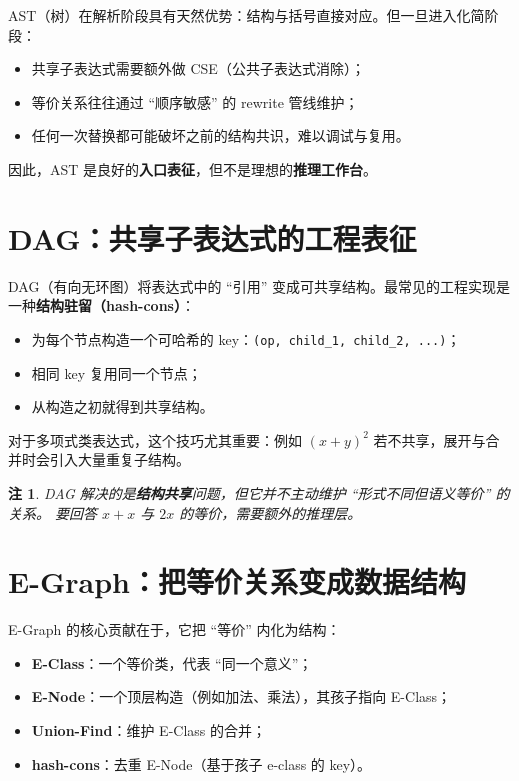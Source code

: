 \documentclass[12pt,openany]{book}
\newtheorem{remark}{注}[chapter]
\begin{document}
AST（树）在解析阶段具有天然优势：结构与括号直接对应。但一旦进入化简阶段：

\begin{itemize}
  \item 共享子表达式需要额外做 CSE（公共子表达式消除）；
  \item 等价关系往往通过 ``顺序敏感'' 的 rewrite 管线维护；
  \item 任何一次替换都可能破坏之前的结构共识，难以调试与复用。
\end{itemize}

因此，AST 是良好的\textbf{入口表征}，但不是理想的\textbf{推理工作台}。

\section{DAG：共享子表达式的工程表征}

DAG（有向无环图）将表达式中的 ``引用'' 变成可共享结构。最常见的工程实现是一种\textbf{结构驻留（hash-cons）}：

\begin{itemize}
  \item 为每个节点构造一个可哈希的 key：\texttt{(op, child\_1, child\_2, ...)}；
  \item 相同 key 复用同一个节点；
  \item 从构造之初就得到共享结构。
\end{itemize}

对于多项式类表达式，这个技巧尤其重要：例如 $(x+y)^2$ 若不共享，展开与合并时会引入大量重复子结构。

\begin{remark}
DAG 解决的是\textbf{结构共享}问题，但它并不主动维护 ``形式不同但语义等价'' 的关系。
要回答 $x+x$ 与 $2x$ 的等价，需要额外的推理层。
\end{remark}

\section{E-Graph：把等价关系变成数据结构}

E-Graph 的核心贡献在于，它把 ``等价'' 内化为结构：

\begin{itemize}
  \item \textbf{E-Class}：一个等价类，代表 ``同一个意义''；
  \item \textbf{E-Node}：一个顶层构造（例如加法、乘法），其孩子指向 E-Class；
  \item \textbf{Union-Find}：维护 E-Class 的合并；
  \item \textbf{hash-cons}：去重 E-Node（基于孩子 e-class 的 key）。
\end{itemize}
\end{document}
